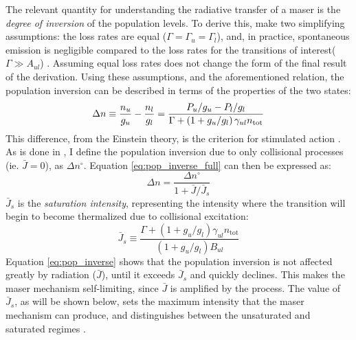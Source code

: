 The relevant quantity for understanding the radiative transfer of a maser is the {\it degree of inversion} of the population levels. To derive this, \citet{stahler_palla_2004} make two simplifying assumptions: the loss rates are equal ($\Gamma=\Gamma_u=\Gamma_l$), and, in practice, spontaneous emission is negligible compared to the loss rates for the transitions of interest($\Gamma \gg A_{ul}$) \citep{elitzur1992_text}. Assuming equal loss rates does not change the form of the final result of the derivation. Using these assumptions, and the aforementioned relation, the population inversion can be described in terms of the properties of the two states:
\begin{equation}
\label{eq:pop_inverse_full}
\Delta n \equiv \frac{n_u}{g_u} - \frac{n_l}{g_l} \\
    = \frac{P_u/g_u - P_l/g_l}{\Gamma + \left( 1 + g_u/g_l \right)\gamma_{ul} n_{\mathrm{tot}}}
\end{equation}
This difference, from the Einstein theory, is the criterion for stimulated action \citep{Gray_2009}. As is done in \citet{stahler_palla_2004}, I define the population inversion due to only collisional processes (ie. $\bar{J}=0$), as $\Delta n^{\circ}$. Equation \ref{eq:pop_inverse_full} can then be expressed as:
\begin{equation}
\label{eq:pop_inverse}
\Delta n = \frac{\Delta n^{\circ}}{1 + \bar{J}/\bar{J}_s}
\end{equation}
$\bar{J}_s$ is the {\it saturation intensity}, representing the intensity where the transition will begin to become thermalized due to collisional excitation:
\begin{equation}
\label{eq:sat_intensity}
\bar{J}_s \equiv \frac{\Gamma + \left( 1 + g_u/g_l \right)\gamma_{ul}n_{\mathrm{tot}}}{\left( 1 + g_u/g_l \right)B_{ul}}
\end{equation}
Equation \ref{eq:pop_inverse} shows that the population inversion is not affected greatly by radiation ($\bar{J}$), until it exceeds $\bar{J}_s$ and quickly declines. This makes the maser mechanism self-limiting, since $\bar{J}$ is amplified by the process. The value of $\bar{J}_s$, as will be shown below, sets the maximum intensity that the maser mechanism can produce, and distinguishes between the unsaturated and saturated regimes \citep{elitzur1992_text}.

